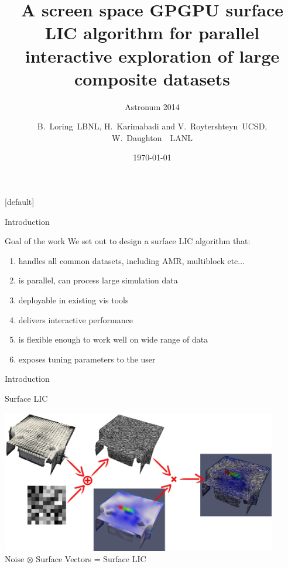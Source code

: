 \documentclass[notes]{beamer}
\title{A screen space GPGPU surface LIC algorithm for parallel interactive exploration of large composite datasets}
\subtitle{Astronum 2014}
\author[Loring, Karimabadi, Roytershteyn, Daughton] %
{\footnotesize B.~Loring~LBNL, H.~Karimabadi and V.~Roytershteyn~UCSD, W.~Daughton~~LANL} %
\date{\today}
\begin{document}
[default]


\frame{\titlepage}

\begin{frame}{Introduction}
  \vspace{-0.1in}
  \begin{beamerboxesrounded}{Goal of the work}
  We set out to design a surface LIC algorithm that:
  \begin{enumerate}
  \item handles all common datasets, including AMR, multiblock etc...
  \item is parallel, can process large simulation data
  \item deployable in existing vis tools
  \item delivers interactive performance
  \item is flexible enough to work well on wide range of data
  \item exposes tuning parameters to the user
  \end{enumerate}
  \end{beamerboxesrounded}
  \end{frame}

\begin{frame}{Introduction}
  \vspace{-0.1in}
  \begin{beamerboxesrounded}{Surface LIC}
  \begin{center}
  \includegraphics[width=4.75in]{office-all-4.png}\vspace{0.05in}\\
  {\footnotesize Noise $\otimes$ Surface Vectors = Surface LIC}
  \end{center}
  \end{beamerboxesrounded}
  \end{frame}
\end{document}
